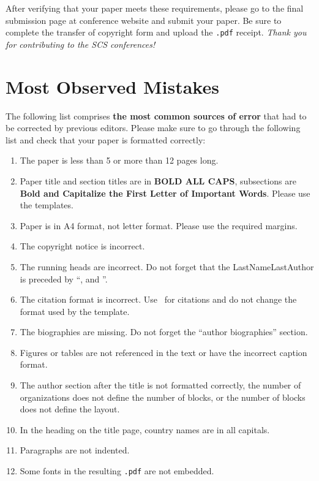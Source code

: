 \documentclass{scspaperproc}
\theoremstyle{scsthe}
\begin{document}
After verifying that your paper meets these requirements, please go to the final submission page at conference website and submit your paper. Be sure to complete the transfer of copyright form and upload the \texttt{.pdf} receipt. \textit{Thank you for contributing to the SCS conferences!}

\section{Most Observed Mistakes}

The following list comprises \textbf{the most common sources of error} that had to be corrected by previous editors. Please make sure to go through the following list and check that your paper is formatted correctly:
\begin{enumerate}
	\item	The paper is less than 5 or more than 12 pages long.
	\item	Paper title and section titles are in \textbf{BOLD ALL CAPS}, subsections are \textbf{Bold and Capitalize the First Letter of Important Words}. Please use the templates.
	\item	Paper is in A4 format, not letter format. Please use the required margins.
	\item	The copyright notice is incorrect.
	\item	The running heads are incorrect. Do not forget that the LastNameLastAuthor is preceded by ``, and ''.
	\item	The citation format is incorrect. Use \BibTeX\ for citations and do not change the format used by the template.
	\item	The biographies are missing. Do not forget the ``author biographies'' section.
	\item	Figures or tables are not referenced in the text or have the incorrect caption format.
	\item	The author section after the title is not formatted correctly, the number of organizations does not define the number of blocks, or the number of blocks does not define the layout.
	\item In the heading on the title page, country names are in all capitals.
	\item	Paragraphs are not indented.
	\item Some fonts in the resulting \texttt{.pdf} are not embedded.
\end{enumerate}
\end{document}
